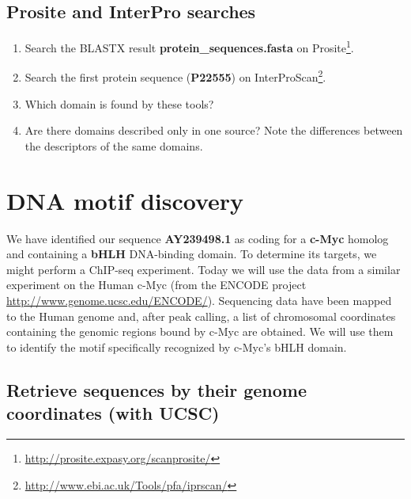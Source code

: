 \documentclass[a4paper,11pt]{article}
\begin{document}
\subsection{Prosite and InterPro searches}

\begin{enumerate}
\item Search the BLASTX result \textbf{protein\_sequences.fasta} on Prosite\footnote{\url{http://prosite.expasy.org/scanprosite/}}.
\item Search the first protein sequence
  (\textbf{P22555}) on
  InterProScan\footnote{\url{http://www.ebi.ac.uk/Tools/pfa/iprscan/}}.
\item Which domain is found by these tools?
\item Are there domains described only in one source? Note the differences between the descriptors of the same domains.
\end{enumerate}

\section{DNA motif discovery}

We have identified our sequence \textbf{AY239498.1} as coding for a
\textbf{c-Myc} homolog and containing a \textbf{bHLH} DNA-binding
domain. To determine its
targets, we might perform a ChIP-seq experiment.
Today we will use the data from a similar experiment on the
Human c-Myc
(from the ENCODE project \url{http://www.genome.ucsc.edu/ENCODE/}). 
Sequencing data have been mapped to the Human genome and, after peak calling,
a list of chromosomal coordinates containing 
the genomic regions bound by c-Myc are obtained. We will use them to identify
the motif specifically recognized by c-Myc's bHLH domain.

\subsection{Retrieve sequences by their genome coordinates (with UCSC)}
\end{document}
